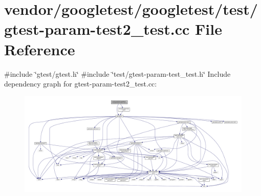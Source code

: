 \hypertarget{gtest-param-test2__test_8cc}{}\section{vendor/googletest/googletest/test/gtest-\/param-\/test2\+\_\+test.cc File Reference}
\label{gtest-param-test2__test_8cc}
{\ttfamily \#include \char`\"{}gtest/gtest.\+h\char`\"{}}\newline
{\ttfamily \#include \char`\"{}test/gtest-\/param-\/test\+\_\+test.\+h\char`\"{}}\newline
Include dependency graph for gtest-\/param-\/test2\+\_\+test.cc\+:
\nopagebreak
\begin{figure}[H]
\begin{center}
\leavevmode
\includegraphics[width=350pt]{gtest-param-test2__test_8cc__incl}
\end{center}
\end{figure}
